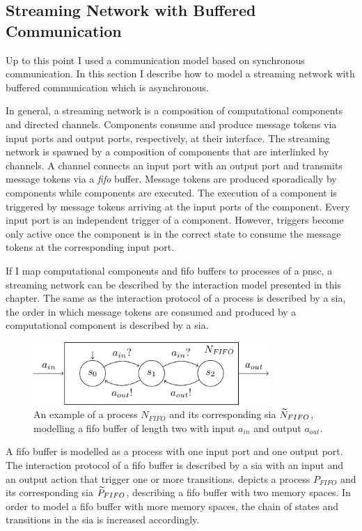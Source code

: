 \subsection{Streaming Network with Buffered Communication}
\label{sect_ecm_example_stream}
Up to this point I used a communication model based on synchronous communication.
In this section I describe how to model a streaming network with buffered communication which is asynchronous.

In general, a streaming network is a composition of computational components and directed channels.
Components consume and produce message tokens via input ports and output ports, respectively, at their interface.
The streaming network is spawned by a composition of components that are interlinked by channels.
A channel connects an input port with an output port and transmits message tokens via a \emph{\gls{fifo}} buffer.
Message tokens are produced sporadically by components while components are executed.
The execution of a component is triggered by message tokens arriving at the input ports of the component.
Every input port is an independent trigger of a component.
However, triggers become only active once the component is in the correct state to consume the message tokens at the corresponding input port.

If I map computational components and \gls{fifo} buffers to processes of a \gls{pnsc}, a streaming network can be described by the interaction model presented in this chapter.
The same as the interaction protocol of a process is described by a \gls{sia}, the order in which message tokens are consumed and produced by a computational component is described by a \gls{sia}.

\begin{figure}[bht]
    \TopFigSpace
    \centering
    \includegraphics[width=9cm]{fig/sia_fifo.pdf}
    \CaptionFigSpace
    \caption{An example of a process $N_{FIFO}$ and its corresponding \gls{sia} $\widetilde{N}_{FIFO}$, modelling a \gls{fifo} buffer of length two with input $a_{in}$ and output $a_{out}$.}
    \label{fig_sia_fifo}
    \BotFigSpace
\end{figure}
A \gls{fifo} buffer is modelled as a process with one input port and one output port.
The interaction protocol of a \gls{fifo} buffer is described by a \gls{sia} with an input and an output action that trigger one or more transitions.
\Fig{\ref{fig_sia_fifo}} depicts a process $P_{FIFO}$ and its corresponding \gls{sia} $\widetilde{P}_{FIFO}$, describing a \gls{fifo} buffer with two memory spaces.
In order to model a \gls{fifo} buffer with more memory spaces, the chain of states and transitions in the \gls{sia} is increased accordingly.

